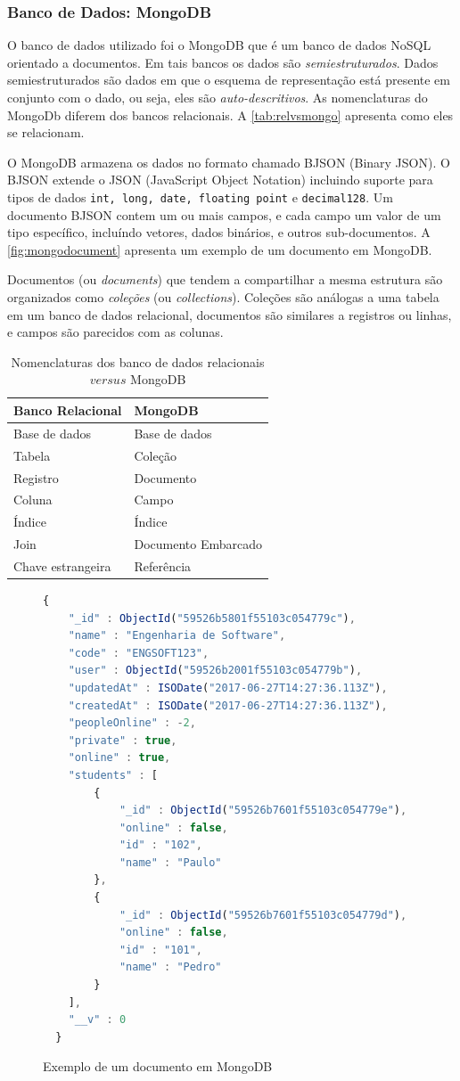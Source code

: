 \subsubsection{Banco de Dados: MongoDB}

O banco de dados utilizado foi o MongoDB que é um banco de dados NoSQL orientado a documentos.
Em tais bancos os dados são \textit{semiestruturados}. Dados semiestruturados
são dados em que o esquema de representação está presente em conjunto com o dado, ou seja,
eles são \textit{auto-descritivos}. As nomenclaturas do MongoDb diferem dos
bancos relacionais. A \autoref{tab:relvsmongo} apresenta como eles se relacionam.

O MongoDB armazena os dados no formato chamado BJSON (Binary JSON). O BJSON extende
o JSON (JavaScript Object Notation) incluindo suporte para tipos de dados
\texttt{int, long, date, floating point} e \texttt{decimal128}. Um documento BJSON contem
um ou mais campos, e cada campo um valor de um tipo específico, incluíndo vetores, dados
binários, e outros sub-documentos. A \autoref{fig:mongodocument} apresenta um
exemplo de um documento em MongoDB.

Documentos (ou \textit{documents}) que tendem a compartilhar a mesma estrutura
são organizados como \textit{coleções} (ou \textit{collections}). Coleções são
análogas a uma tabela em um banco de dados relacional, documentos são similares
a registros ou linhas, e campos são parecidos com as colunas.


\begin{table}[!ht]
  \centering
  \caption{Nomenclaturas dos banco de dados relacionais $versus$ MongoDB}
  \begin{tabular}{l||l}
    \hline
    \textbf{Banco Relacional} & \textbf{MongoDB}\tabularnewline
    \hline
    \hline
    Base de dados & Base de dados\tabularnewline
    Tabela & Coleção\tabularnewline
    Registro & Documento\tabularnewline
    Coluna & Campo\tabularnewline
    Índice & Índice\tabularnewline
    Join & Documento Embarcado\tabularnewline
    Chave estrangeira & Referência\tabularnewline
    \hline
  \end{tabular}
  \doautor
  \label{tab:relvsmongo}
\end{table}

\begin{figure}[ht]
  \caption{Exemplo de um documento em MongoDB}
  \label{fig:mongodocument}
  \begin{lstlisting}[language=JavaScript]
  {
  	"_id" : ObjectId("59526b5801f55103c054779c"),
  	"name" : "Engenharia de Software",
  	"code" : "ENGSOFT123",
  	"user" : ObjectId("59526b2001f55103c054779b"),
  	"updatedAt" : ISODate("2017-06-27T14:27:36.113Z"),
  	"createdAt" : ISODate("2017-06-27T14:27:36.113Z"),
  	"peopleOnline" : -2,
  	"private" : true,
  	"online" : true,
  	"students" : [
  		{
  			"_id" : ObjectId("59526b7601f55103c054779e"),
  			"online" : false,
  			"id" : "102",
  			"name" : "Paulo"
  		},
  		{
  			"_id" : ObjectId("59526b7601f55103c054779d"),
  			"online" : false,
  			"id" : "101",
  			"name" : "Pedro"
  		}
  	],
  	"__v" : 0
  }
  \end{lstlisting}
  \doautor
\end{figure}

